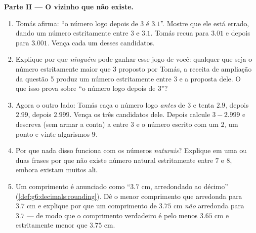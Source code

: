 \begin{problem}
\medskip
\noindent\textbf{Parte II --- O vizinho que não existe.}
\begin{enumerate}[resume]
  \item Tomás afirma: ``o número logo depois de $3$ é $3.1$''. Mostre
        que ele está errado, dando um número estritamente entre $3$ e
        $3.1$. Tomás recua para $3.01$ e depois para $3.001$. Vença
        cada um desses candidatos.
  \item Explique por que \emph{ninguém} pode ganhar esse jogo de você:
        qualquer que seja o número estritamente maior que $3$ proposto
        por Tomás, a receita de ampliação da questão 5 produz um número
        estritamente entre $3$ e a proposta dele. O que isso prova
        sobre ``o número logo depois de $3$''?
  \item Agora o outro lado: Tomás caça o número logo \emph{antes} de
        $3$ e tenta $2.9$, depois $2.99$, depois $2.999$. Vença os três
        candidatos dele. Depois calcule $3 - 2.999$ e descreva (sem
        armar a conta) a  entre $3$ e o número escrito com um
        $2$, um ponto e vinte algarismos $9$.
  \item Por que nada disso funciona com os números \emph{naturais}?
        Explique em uma ou duas frases por que não existe número
        natural estritamente entre $7$ e $8$, embora existam muitos
         ali.
  \item Um comprimento é anunciado como ``$3.7$ cm, arredondado ao
        décimo'' (\cref{def:g6:decimals:rounding}). Dê o menor
        comprimento que arredonda para $3.7$ cm e explique por que um
        comprimento de $3.75$ cm \emph{não} arredonda para $3.7$ ---
        de modo que o comprimento verdadeiro é pelo menos $3.65$ cm e
        estritamente menor que $3.75$ cm.
\end{enumerate}


\end{problem}

